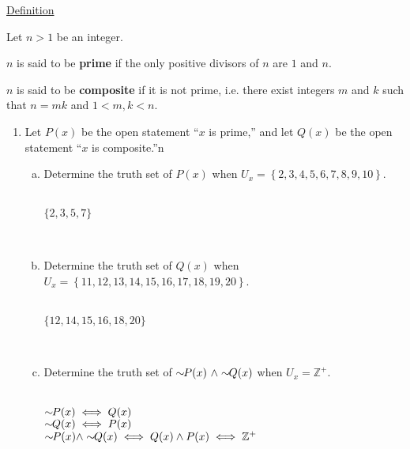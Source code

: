 \documentclass[12pt]{amsart}
\newcommand{\NOT}[1]{\ensuremath{\sim\hspace{-0.05in}#1}}
\begin{document}
\vspace{0.2in}
\noindent
\underline{Definition}

\vspace{0.05in}
\noindent
Let $n>1$ be an integer.

\vspace{0.05in}
\noindent
$n$ is said to be \textbf{prime} if the only positive divisors of $n$ are $1$ and $n$.

\vspace{0.05in}
\noindent
$n$ is said to be \textbf{composite} if it is not prime, i.e. there exist integers $m$ and $k$ such that $n=mk$ and $1<m, k<n$. 

\newpage
\begin{enumerate}[{\bfseries 1.}]
\addtocounter{enumi}{2}
\item Let $P(x)$ be the open statement ``$x$ is prime,'' and let $Q(x)$ be the open statement ``$x$ is composite.''n 
	\begin{enumerate}[(a)]
	\vspace{0.1in}
	\item Determine the truth set of $P(x)$ when $U_{x}=\left\{2, 3, 4, 5, 6, 7, 8, 9, 10\right\}$.
	\begin{normalize}
	    \vspace{0.1in}
        \\$\{2, 3, 5, 7\}$\tab
    \end{normalize}
    \\
	\item Determine the truth set of $Q(x)$ when $U_{x}=\left\{11, 12, 13, 14, 15, 16, 17, 18, 19, 20\right\}$.
	\begin{normalize}
	    \vspace{0.1in}
        \\$\{12, 14, 15, 16, 18, 20\}$\tab
    \end{normalize}
    \\
	\item Determine the truth set of $\NOT{P(x)}\ \land\NOT{Q(x)}$ when $U_{x}=\mathbb{Z}^{+}$.
	\begin{normalize}
	    \vspace{0.1in}
        \\$\NOT{P(x)} \iff{Q(x)}$\tab
        \\$\NOT{Q(x)} \iff{P(x)}$\tab
        \\$\NOT{P(x)} \land \NOT{Q(x)} \iff{Q(x) \land P(x)} \iff{\mathbb{Z}^{+}}$\tab 
    \end{normalize}
	\end{enumerate}


\end{enumerate}
\end{document}

